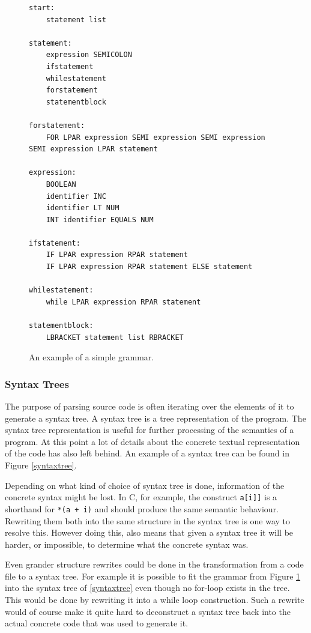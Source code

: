 \documentclass[11pt]{article}
\begin{document}
\begin{figure}
  \caption{An example of a simple grammar.}
  \label{grammar}
\begin{verbatim}
start:
    statement list

statement:
    expression SEMICOLON
    ifstatement
    whilestatement
    forstatement
    statementblock

forstatement:
    FOR LPAR expression SEMI expression SEMI expression SEMI expression LPAR statement
    
expression:
    BOOLEAN
    identifier INC
    identifier LT NUM
    INT identifier EQUALS NUM
    
ifstatement:
    IF LPAR expression RPAR statement
    IF LPAR expression RPAR statement ELSE statement

whilestatement:
    while LPAR expression RPAR statement
    
statementblock:
    LBRACKET statement list RBRACKET
\end{verbatim}
\end{figure}

\subsubsection{Syntax Trees}
The purpose of parsing source code is often iterating over the elements of it to generate a syntax tree. A syntax tree is a tree representation of the program. The syntax tree representation is useful for further processing of the semantics of a program. At this point a lot of details about the concrete textual representation of the code has also left behind. An example of a syntax tree can be found in Figure \ref{syntaxtree}. 

Depending on what kind of choice of syntax tree is done, information of the concrete syntax might be lost. In C, for example, the construct \texttt{a[i]]} is a shorthand for \texttt{*(a + i)} and should produce the same semantic behaviour. Rewriting them both into the same structure in the syntax tree is one way to resolve this. However doing this, also means that given a syntax tree it will be harder, or impossible, to determine what the concrete syntax was.

Even grander structure rewrites could be done in the transformation from a code file to a syntax tree. For example it is possible to fit the grammar from Figure \ref{grammar} into the syntax tree of \ref{syntaxtree} even though no for-loop exists in the tree. This would be done by rewriting it into a while loop construction. Such a rewrite would of course make it quite hard to deconstruct a syntax tree back into the actual concrete code that was used to generate it.
\end{document}
